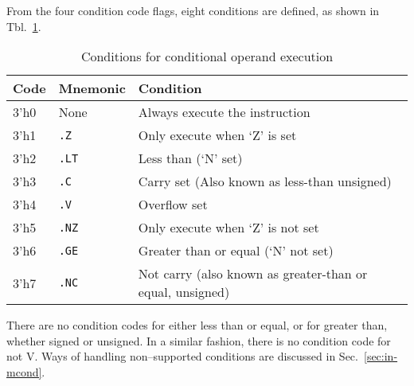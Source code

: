 \documentclass{gqtekspec}
\begin{document}
From the four condition code flags, eight conditions are defined, as shown in
Tbl.~\ref{tbl:conditions}.
\begin{table}\begin{center}
\begin{tabular}{l|l|l}
Code & Mnemonic & Condition \\\hline
3'h0 & None & Always execute the instruction \\
3'h1 & {\tt .Z} & Only execute when `Z' is set \\
3'h2 & {\tt .LT}& Less than (`N' set) \\
3'h3 & {\tt .C} & Carry set (Also known as less-than unsigned) \\
3'h4 & {\tt .V} & Overflow set\\
3'h5 & {\tt .NZ}& Only execute when `Z' is not set \\
3'h6 & {\tt .GE}& Greater than or equal (`N' not set) \\
3'h7 & {\tt .NC}& Not carry (also known as greater-than or equal, unsigned) \\
\end{tabular}
\caption{Conditions for conditional operand execution}\label{tbl:conditions}
\end{center}\end{table}
There are no condition codes for either less than or equal, or for greater
than, whether signed or unsigned.  In a similar fashion, there is no condition
code for not V.  Ways of handling non--supported conditions are discussed
in Sec.~\ref{sec:in-mcond}.
\end{document}
